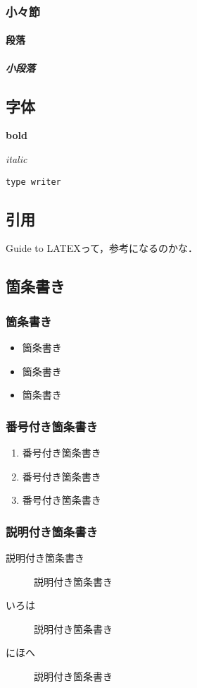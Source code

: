 \documentclass[main]{subfiles}
\begin{document}
\subsubsection*{小々節}

\paragraph*{段落}
\jalipsumiroha

\subparagraph*{小段落}
\jalipsumiroha


\subsection{字体}

\textbf{bold}

\textit{italic}

\texttt{type writer}


\subsection{引用}
Guide to LATEX\cite{kopka2003guide}って，参考になるのかな．

\subsection{箇条書き}

\subsubsection{箇条書き}
\begin{itemize}
  \item 箇条書き
  \item 箇条書き
  \item 箇条書き
\end{itemize}


\subsubsection{番号付き箇条書き}
\begin{enumerate}
  \item 番号付き箇条書き
  \item 番号付き箇条書き
  \item 番号付き箇条書き
\end{enumerate}


\subsubsection{説明付き箇条書き}
\begin{description}
  \item[説明付き箇条書き] 説明付き箇条書き
  \item[いろは] 説明付き箇条書き
  \item[にほへ] 説明付き箇条書き
\end{description}
\end{document}
